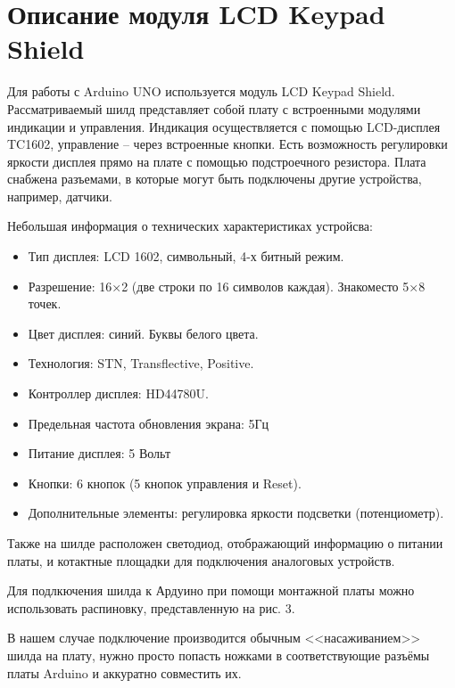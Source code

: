 \documentclass[a4paper, 12pt]{article}%
\begin{document}
\newpage

\section{Описание модуля LCD Keypad Shield}

Для работы с Arduino UNO используется модуль LCD Keypad Shield. Рассматриваемый шилд представляет собой плату с встроенными модулями индикации и управления. Индикация осуществляется с помощью LCD-дисплея TC1602, управление – через встроенные кнопки. Есть возможность регулировки яркости дисплея прямо на плате с помощью подстроечного резистора. Плата снабжена разъемами, в которые могут быть подключены другие устройства, например, датчики.

Небольшая информация о технических характеристиках устройсва:

\begin{itemize}
\item Тип дисплея: LCD 1602, символьный, 4-х битный режим.

\item Разрешение: 16×2 (две строки по 16 символов каждая). Знакоместо 5×8 точек.

\item Цвет дисплея: синий. Буквы белого цвета.

\item Технология: STN, Transflective, Positive.

\item Контроллер дисплея: HD44780U.

\item Предельная частота обновления экрана: 5Гц

\item Питание дисплея: 5 Вольт

\item Кнопки: 6 кнопок (5 кнопок управления и Reset).

\item Дополнительные элементы: регулировка яркости подсветки (потенциометр).
\end{itemize}

Также на шилде расположен светодиод, отображающий информацию о питании платы, и котактные площадки для подключения аналоговых устройств.

Для подлкючения шилда к Ардуино при помощи монтажной платы можно использовать распиновку, представленную на рис. 3.

В нашем случае подключение производится обычным <<насаживанием>> шилда на плату, нужно просто попасть ножками в соответствующие разъёмы платы Arduino и аккуратно совместить их.
\end{document}
